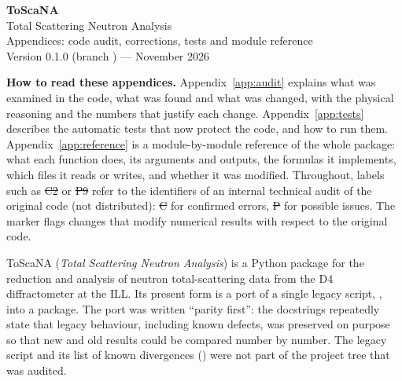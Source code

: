 \documentclass[11pt,a4paper]{article}
\begin{document}
\ifdefined\ToScaNAManual\else
\begin{center}
  {\LARGE\bfseries ToScaNA}\\[4pt]
  {\large Total Scattering Neutron Analysis}\\[10pt]
  {\Large Appendices: code audit, corrections, tests and module reference}\\[10pt]
  {\normalsize Version 0.1.0 (branch ) --- November 2026}
\end{center}
\bigskip
\noindent\textbf{How to read these appendices.}
Appendix~\ref{app:audit} explains what was examined in the code, what was
found and what was changed, with the physical reasoning and the numbers
that justify each change. Appendix~\ref{app:tests} describes the automatic
tests that now protect the code, and how to run them.
Appendix~\ref{app:reference} is a module-by-module reference of the whole
package: what each function does, its arguments and outputs, the formulas
it implements, which files it reads or writes, and whether it was modified.
Throughout, labels such as \st{C2} or \st{P9} refer to the identifiers of
an internal technical audit of the original code (not distributed): \st{C} for confirmed
errors, \st{P} for possible issues. The marker \newbeh{} flags changes that
modify numerical results with respect to the original code.

\tableofcontents
\clearpage
\appendix
\fi

\label{app:audit}


ToScaNA (\emph{Total Scattering Neutron Analysis}) is a Python package for
the reduction and analysis of neutron total-scattering data from the D4
diffractometer at the ILL. Its present form is a port of a single legacy
script, , into a package. The port was
written ``parity first'': the docstrings repeatedly state that legacy
behaviour, including known defects, was preserved on purpose so that new
and old results could be compared number by number. The legacy script and
its list of known divergences () were not part
of the project tree that was audited.
\end{document}
